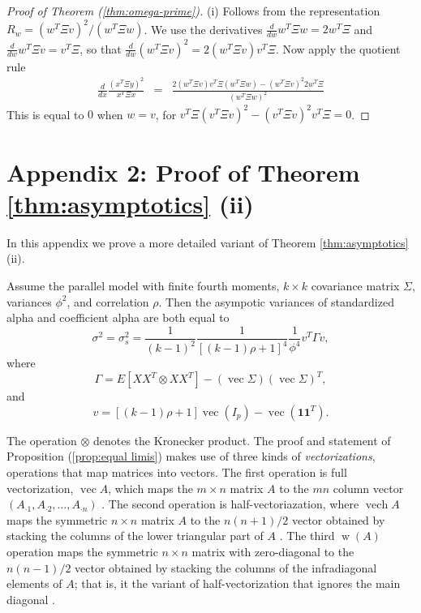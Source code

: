 \documentclass[twoside]{article}
\DeclareMathOperator{\vvec}{vec}
\DeclareMathOperator{\vech}{vech}
\DeclareMathOperator{\w}{w}
\begin{document}
\begin{proof}[Proof of Theorem (\ref{thm:omega-prime})]
(i) Follows from the representation $R_w = (w^T\Xi v)^2/(w^T\Xi w)$. We use the derivatives $\frac{d}{dw}w^{T}\Xi w=2w^{T}\Xi$ and $\frac{d}{dw}w^{T}\Xi v=v^{T}\Xi$,
so that $\frac{d}{dw}(w^{T}\Xi v)^{2}=2(w^{T}\Xi v)v^{T}\Xi$. Now
apply the quotient rule
\begin{eqnarray*}
\frac{d}{dx}\frac{(x^{T}\Xi y)^{2}}{x^{T}\Xi x} & = & \frac{2(w^{T}\Xi v)v^{T}\Xi(w^{T}\Xi w)-(w^{T}\Xi v)^{2}2w^{T}\Xi}{(w^{T}\Xi w)^{2}}
\end{eqnarray*}
This is equal to $0$ when $w=v$, for $v^{T}\Xi(v^{T}\Xi v)^{2}-(v^{T}\Xi v)^{2}v^{T}\Xi=0$.
\end{proof}
\section*{Appendix 2: Proof of Theorem \ref{thm:asymptotics} (ii)}
\label{Appendix 2}

In this appendix we prove a more detailed variant of Theorem \ref{thm:asymptotics} (ii).
\begin{prop}
\label{prop:equal limis}Assume the parallel model with finite fourth
moments, $k\times k$ covariance matrix $\Sigma$, variances $\phi^{2}$,
and correlation $\rho$. Then the asympotic variances of standardized
alpha and coefficient alpha are both equal to 
\begin{equation}
\sigma^{2}=\sigma_{s}^{2}=\frac{1}{(k-1)^{2}}\frac{1}{[(k-1)\rho+1]^{4}}\frac{1}{\phi^{4}}v^{T}\Gamma v,\label{eq:asymptotic variance-1}
\end{equation}
where 
\begin{equation}
\nonumber
\Gamma = E[XX^{T}\otimes XX^{T}]-(\vvec\Sigma)(\vvec\Sigma)^{T},
\end{equation}
 and
\[
v=[(k-1)\rho+1]\vvec(I_{p})-\vvec(\boldsymbol{1}\boldsymbol{1}^{T}).
\]
\end{prop}

The operation $\otimes$ denotes the Kronecker product. The proof and statement of Proposition (\ref{prop:equal limis}) makes use of three
kinds of \emph{vectorizations}, operations that map matrices into
vectors. The first operation is full vectorization, $\vvec A$, which
maps the $m\times n$ matrix $A$ to the $mn$ column vector $(A_{\cdot1},A_{\cdot2},\ldots,A_{\cdot n})$
\citep[Chapter 2.4]{Magnus2019-cz}. The second operation is half-vectoriazation,
where $\vech A$ maps the symmetric $n\times n$ matrix $A$ to the
$n(n+1)/2$ vector obtained by stacking the columns of the lower triangular
part of $A$ \citep[Chapter 3.8]{Magnus2019-cz}. The third $\w(A)$
operation maps the symmetric $n\times n$ matrix with zero-diagonal
to the $n(n-1)/2$ vector obtained by stacking the columns of the
infradiagonal elements of $A$; that is, it the variant of half-vectorization
that ignores the main diagonal \citep{Neudecker1996-fu}. 
\end{document}
